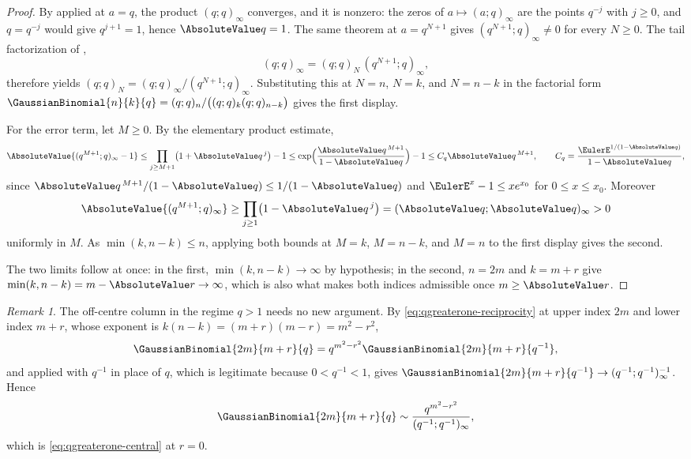 \documentclass[11pt,a4paper,oneside,openany]{book}
\theoremstyle{definition}
\theoremstyle{remark}
\newtheorem{remark}[remark]{Remark}
\begin{document}
\begin{proof}
By  applied at $a=q$, the product $(q;q)_\infty$
converges, and it is nonzero: the zeros of $a\mapsto(a;q)_\infty$ are the
points $q^{-j}$ with $j\ge0$, and $q=q^{-j}$ would give $q^{j+1}=1$, hence
$\AbsoluteValue q=1$.  The same theorem at $a=q^{N+1}$ gives $(q^{N+1};q)_\infty\ne0$
for every $N\ge0$.  The tail factorization of ,
\[
 (q;q)_\infty=(q;q)_N\,(q^{N+1};q)_\infty,
\]
therefore yields $(q;q)_N=(q;q)_\infty/(q^{N+1};q)_\infty$.  Substituting this
at $N=n$, $N=k$, and $N=n-k$ in the factorial form
$\GaussianBinomial{n}{k}{q}=(q;q)_n/\bigl((q;q)_k(q;q)_{n-k}\bigr)$ gives the first display.

For the error term, let $M\ge0$.  By the elementary product estimate,
\[
 \AbsoluteValue{(q^{M+1};q)_\infty-1}
 \le\prod_{j\ge M+1}\bigl(1+\AbsoluteValue q^{\,j}\bigr)-1
 \le\exp\Bigl(\frac{\AbsoluteValue q^{\,M+1}}{1-\AbsoluteValue q}\Bigr)-1
 \le C_q\AbsoluteValue q^{\,M+1},
 \qquad
 C_q=\frac{\EulerE^{1/(1-\AbsoluteValue q)}}{1-\AbsoluteValue q},
\]
since $\AbsoluteValue q^{\,M+1}/(1-\AbsoluteValue q)\le1/(1-\AbsoluteValue q)$ and $\EulerE^x-1\le xe^{x_0}$ for
$0\le x\le x_0$.  Moreover
\[
 \AbsoluteValue{(q^{M+1};q)_\infty}
 \ge\prod_{j\ge1}\bigl(1-\AbsoluteValue q^{\,j}\bigr)
 =(\AbsoluteValue q;\AbsoluteValue q)_\infty>0
\]
uniformly in $M$.  As $\min(k,n-k)\le n$, applying both bounds at $M=k$,
$M=n-k$, and $M=n$ to the first display gives the second.

The two limits follow at once: in the first, $\min(k,n-k)\to\infty$ by
hypothesis; in the second, $n=2m$ and $k=m+r$ give
$\min(k,n-k)=m-\AbsoluteValue r\to\infty$, which is also what makes both indices
admissible once $m\ge\AbsoluteValue r$.
\end{proof}

\begin{remark}\label{rem:offcentre-qgreaterone}
The off-centre column in the regime $q>1$ needs no new argument.  By
\eqref{eq:qgreaterone-reciprocity} at upper index $2m$ and lower index $m+r$,
whose exponent is $k(n-k)=(m+r)(m-r)=m^2-r^2$,
\[
 \GaussianBinomial{2m}{m+r}{q}=q^{m^2-r^2}\GaussianBinomial{2m}{m+r}{q^{-1}},
\]
and  applied with $q^{-1}$ in place of $q$, which is
legitimate because $0<q^{-1}<1$, gives
$\GaussianBinomial{2m}{m+r}{q^{-1}}\to(q^{-1};q^{-1})_\infty^{-1}$.  Hence
\[
 \GaussianBinomial{2m}{m+r}{q}
 \sim\frac{q^{m^2-r^2}}{(q^{-1};q^{-1})_\infty},
\]
which is \eqref{eq:qgreaterone-central} at $r=0$.
\end{remark}
\end{document}
